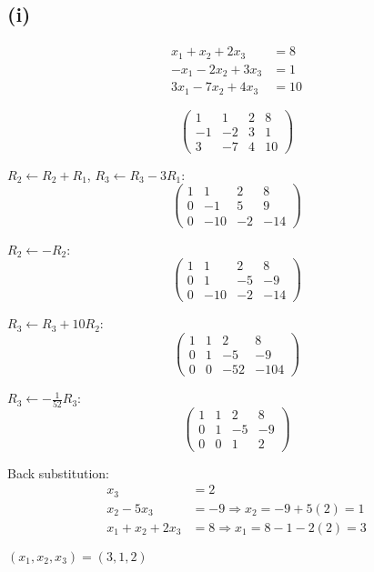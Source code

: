 \subsection*{(i)}
\begin{align*}
	x_1 + x_2 + 2x_3   & = 8  \\
	-x_1 - 2x_2 + 3x_3 & = 1  \\
	3x_1 - 7x_2 + 4x_3 & = 10
\end{align*}

\[
	\left(\begin{array}{ccc|c}
			1  & 1  & 2 & 8  \\
			-1 & -2 & 3 & 1  \\
			3  & -7 & 4 & 10
		\end{array}\right)
\]

$R_2 \leftarrow R_2 + R_1$, $R_3 \leftarrow R_3 - 3R_1$:
\[
	\left(\begin{array}{ccc|c}
			1 & 1   & 2  & 8   \\
			0 & -1  & 5  & 9   \\
			0 & -10 & -2 & -14
		\end{array}\right)
\]

$R_2 \leftarrow -R_2$:
\[
	\left(\begin{array}{ccc|c}
			1 & 1   & 2  & 8   \\
			0 & 1   & -5 & -9  \\
			0 & -10 & -2 & -14
		\end{array}\right)
\]

$R_3 \leftarrow R_3 + 10R_2$:
\[
	\left(\begin{array}{ccc|c}
			1 & 1 & 2   & 8    \\
			0 & 1 & -5  & -9   \\
			0 & 0 & -52 & -104
		\end{array}\right)
\]

$R_3 \leftarrow -\frac{1}{52}R_3$:
\[
	\left(\begin{array}{ccc|c}
			1 & 1 & 2  & 8  \\
			0 & 1 & -5 & -9 \\
			0 & 0 & 1  & 2
		\end{array}\right)
\]

Back substitution:
\begin{align*}
	x_3 &= 2 \\
	x_2 - 5x_3 &= -9 \Rightarrow x_2 = -9 + 5(2) = 1 \\
	x_1 + x_2 + 2x_3 &= 8 \Rightarrow x_1 = 8 - 1 - 2(2) = 3
\end{align*}

$\boxed{(x_1, x_2, x_3) = (3, 1, 2)}$